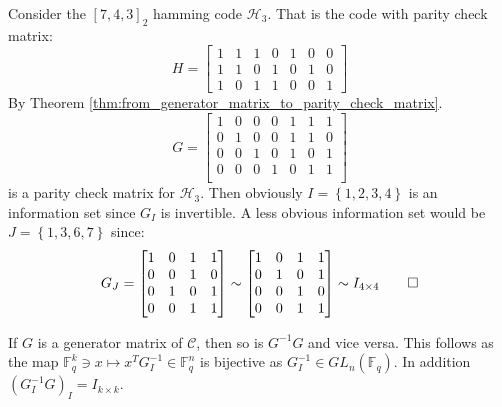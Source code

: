\begin{example}\label{exmp:information_sets_of_hamming}
  Consider the $[7, 4, 3]_2$ hamming code $\mathcal{H}_{3}$. That is the code with parity check matrix:
  \begin{equation*}
    H = \begin{bmatrix}
          1 & 1 & 1 & 0 & 1 & 0 & 0 \\
          1 & 1 & 0 & 1 & 0 & 1 & 0 \\
          1 & 0 & 1 & 1 & 0 & 0 & 1
        \end{bmatrix}
  \end{equation*}
  By Theorem \ref{thm:from_generator_matrix_to_parity_check_matrix}.
  \begin{equation*}
    G = \begin{bmatrix}
1 & 0 & 0 & 0 & 1 & 1 & 1 \\
0 & 1 & 0 & 0 & 1 & 1 & 0 \\
0 & 0 & 1 & 0 & 1 & 0 & 1 \\
0 & 0 & 0 & 1 & 0 & 1 & 1 \\
        \end{bmatrix}
  \end{equation*}
  is a parity check matrix for $\mathcal{H}_{3}$. Then obviously $I = \left\{1, 2, 3, 4\right\}$ is an information set since $G_{I}$ is invertible. A less obvious information set would be $J = \left\{1, 3, 6, 7\right\}$ since:
  \begin{equation*}
    G_{J} = \begin{bmatrix}
                1 & 0 & 1 & 1 \\
                0 & 0 & 1 & 0 \\
                0 & 1 & 0 & 1 \\
                0 & 0 & 1 & 1 \\
              \end{bmatrix} \sim \begin{bmatrix}
                                   1 & 0 & 1 & 1 \\
                                   0 & 1 & 0 & 1 \\
                                   0 & 0 & 1 & 0 \\
                                   0 & 0 & 1 & 1
                                 \end{bmatrix} \sim I_{4 \times 4} \qedhere
  \end{equation*}
\end{example}

\begin{remark}
If $G$ is a generator matrix of $\mathcal{C}$, then so is $G^{-1}G$ and vice versa. This follows as the map $\mathbb{F}_q^{k} \ni x \mapsto x^{T} G_I^{-1} \in \mathbb{F}_q^n$ is bijective as $G_I^{-1} \in GL_n(\mathbb{F}_q)$. In addition $(G_{I}^{-1}G)_{I} = I_{k \times k}$.
\end{remark}

